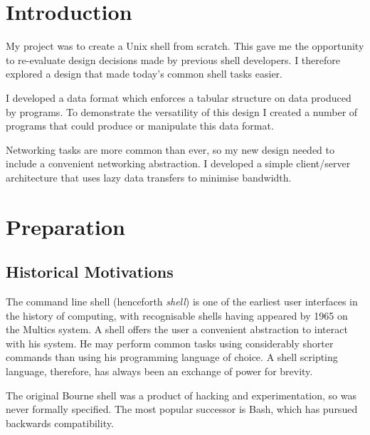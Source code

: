 \documentclass[12pt,twoside,notitlepage]{report}
\begin{document}

\cleardoublepage        %

\setcounter{page}{1}
\pagestyle{headings}

\chapter{Introduction}
My project was to create a Unix shell from scratch. This gave me the opportunity
to re-evaluate design decisions made by previous shell developers. I therefore
explored a design that made today's common shell tasks easier.

I developed a data format which enforces a tabular structure on data produced by
programs. To demonstrate the versatility of this design I created a number of
programs that could produce or manipulate this data format.

Networking tasks are more common than ever, so my new design needed to include a
convenient networking abstraction. I developed a simple client/server
architecture that uses lazy data transfers to minimise bandwidth.


\cleardoublepage

\chapter{Preparation}

\section{Historical Motivations}
The command line shell (henceforth \emph{shell}) is one of the earliest user
interfaces in the history of computing, with recognisable shells having appeared
by 1965 \cite{multics} on the Multics system. A shell offers the user a
convenient abstraction to interact with his system. He may perform common tasks
using considerably shorter commands than using his programming language of
choice. A shell scripting language, therefore, has always been an exchange of
power for brevity.

The original Bourne shell was a product of hacking and experimentation, so was
never formally specified. The most popular successor is Bash, which has pursued
backwards compatibility.
\end{document}
